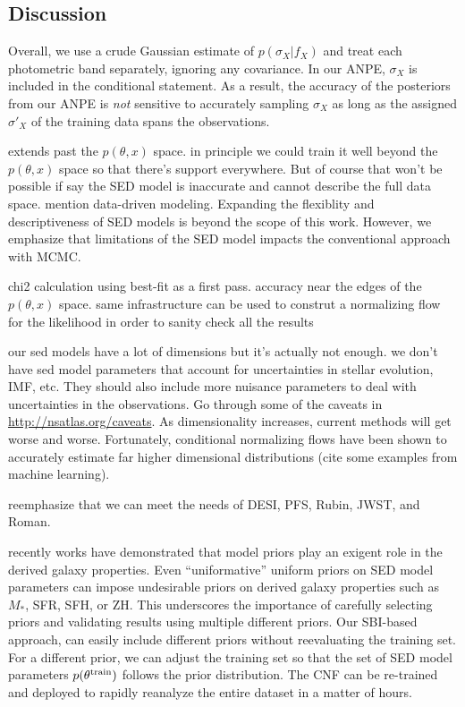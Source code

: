 \subsection{Discussion} \label{sec:discuss}

Overall, we use a crude Gaussian estimate of $p(\sigma_X | f_X)$ and treat each
photometric band separately, ignoring any covariance. 
In our ANPE, $\sigma_X$ is included in the conditional statement. 
As a result, the accuracy of the posteriors from our ANPE is \emph{not}
sensitive to accurately sampling $\sigma_X$ as long as the assigned $\sigma'_X$
of the training data spans the observations.  

extends past the $p(\theta, x)$ space.
in principle we could train it well beyond the $p(\theta, x)$ space so that
there's support everywhere. 
But of course that won't be possible if say the SED model is inaccurate and
cannot describe the full data space.  
mention data-driven modeling. 
Expanding the flexiblity and descriptiveness of SED models is beyond the scope
of this work. 
However, we emphasize that limitations of the SED model impacts the
conventional approach with MCMC. 

chi2 calculation using best-fit as a first pass. 
accuracy near the edges of the $p(\theta, x)$ space. same infrastructure can be
used to construt a normalizing flow for the likelihood in order to sanity check
all the results 

our sed models have a lot of dimensions but it's actually not enough. 
we don't have sed model parameters that account for uncertainties in stellar
evolution, IMF, etc. 
They should also include more nuisance parameters to deal with uncertainties in
the observations. 
Go through some of the caveats in \url{http://nsatlas.org/caveats}. 
As dimensionality increases, current methods will get worse and worse. 
Fortunately, conditional normalizing flows have been shown to accurately
estimate far higher dimensional distributions (cite some examples from machine
learning). 

reemphasize that we can meet the needs of DESI, PFS, Rubin, JWST, and Roman. 

recently works have demonstrated that model priors play an exigent role in the
derived galaxy properties. 
Even ``uniformative'' uniform priors on SED model parameters can impose
undesirable priors on derived galaxy properties such as $M_*$, SFR, SFH, or
ZH.
This underscores the importance of carefully selecting priors and validating
results using multiple different priors. 
Our SBI-based approach, can easily include different priors without
reevaluating the training set.
For a different prior, we can adjust the training set so that the set of SED
model parameters $p(\theta^{\rm train})$ follows the prior distribution. 
The CNF can be re-trained and deployed to rapidly reanalyze the entire dataset
in a matter of hours. 


